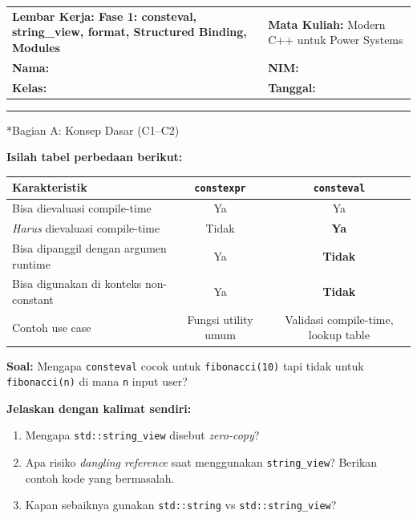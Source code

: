 \documentclass[12pt,a4paper]{article}
\makeatletter
\newcommand{\worksheetheader}[2]{
  \noindent
  \begin{tabular}{@{}p{0.6\textwidth}p{0.4\textwidth}@{}}
    \textbf{\large Lembar Kerja: #1} & \textbf{Mata Kuliah:} Modern C++ untuk Power Systems \\
    \textbf{Nama:} \underline{\hspace{5cm}} & \textbf{NIM:} \underline{\hspace{3cm}} \\
    \textbf{Kelas:} \underline{\hspace{2cm}} & \textbf{Tanggal:} \underline{\hspace{2.5cm}}
  \end{tabular}
  \vspace{0.5cm}
  \hrule
  \vspace{0.5cm}
}
\makeatother
\begin{document}
\worksheetheader{Fase 1: consteval, string\_view, format, Structured Binding, Modules}

\section*{Bagian A: Konsep Dasar (C1--C2)}

\begin{tcolorbox}[colback=UBgreen!5, colframe=UBgreen, title=\textbf{A1. consteval vs constexpr (C1: Remember)}]
\textbf{Isilah tabel perbedaan berikut:}

\begin{center}
\begin{tabular}{|l|c|c|}
\hline
\textbf{Karakteristik} & \texttt{constexpr} & \texttt{consteval} \\
\hline
Bisa dievaluasi compile-time & Ya & Ya \\
\hline
\emph{Harus} dievaluasi compile-time & Tidak & \textbf{Ya} \\
\hline
Bisa dipanggil dengan argumen runtime & Ya & \textbf{Tidak} \\
\hline
Bisa digunakan di konteks non-constant & Ya & \textbf{Tidak} \\
\hline
Contoh use case & Fungsi utility umum & Validasi compile-time, lookup table \\
\hline
\end{tabular}
\end{center}

\textbf{Soal:} Mengapa \texttt{consteval} cocok untuk \texttt{fibonacci(10)} tapi tidak untuk \texttt{fibonacci(n)} di mana \texttt{n} input user?
\end{tcolorbox}

\vspace{0.5cm}

\begin{tcolorbox}[colback=UBgreen!5, colframe=UBgreen, title=\textbf{A2. std::string\_view (C2: Understand)}]
\textbf{Jelaskan dengan kalimat sendiri:}

\begin{enumerate}[label=\alph*)]
  \item Mengapa \texttt{std::string\_view} disebut \textit{zero-copy}?
  
  \vspace{2cm}
  
  \item Apa risiko \textit{dangling reference} saat menggunakan \texttt{string\_view}? Berikan contoh kode yang bermasalah.
  
  \vspace{3cm}
  
  \item Kapan sebaiknya gunakan \texttt{std::string} vs \texttt{std::string\_view}?
  
  \vspace{2cm}
\end{enumerate}
\end{tcolorbox}
\end{document}
